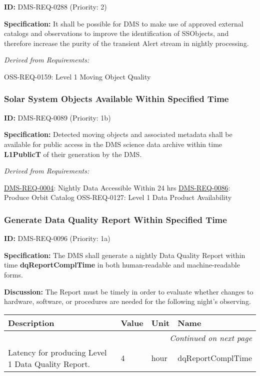 \documentclass[SE,toc,lsstdraft]{lsstdoc}
\makeatletter
\newcommand{\paramname}[1]{\hspace{0pt}#1}
\newcommand{\unitname}[1]{\hspace{0pt}#1}
\newenvironment{parameters}[0]{%
\setlength\LTleft{0pt}
\setlength\LTright{\fill}
\begin{small}
\begin{longtable}[]{|p{0.49\textwidth}|l|p{0.6in}|p{1.70in}@{}|}

\hline \textbf{Description} & \textbf{Value} & \textbf{Unit} & \textbf{Name} \\ \hline
\endhead

\hline \multicolumn{4}{r}{\emph{Continued on next page}} \\
\endfoot

\hline\hline
\endlastfoot
}{%
\hline
\end{longtable}
\end{small}
}
\makeatother
\begin{document}
\label{DMS-REQ-0288}
\textbf{ID:} DMS-REQ-0288 (Priority: 2)

\textbf{Specification:} It shall be possible for DMS to make use of approved external catalogs and observations to improve the identification of SSObjects, and therefore increase the purity of the transient Alert stream in nightly processing.

\emph{Derived from Requirements:}

OSS-REQ-0159:
Level 1 Moving Object Quality \newline

\subsubsection{Solar System Objects Available Within Specified Time}

\label{DMS-REQ-0089}
\textbf{ID:} DMS-REQ-0089 (Priority: 1b)

\textbf{Specification:} Detected moving objects and associated metadata shall be available for public access in the DMS science data archive within time \textbf{L1PublicT }of their generation by the DMS.

\emph{Derived from Requirements:}

\hyperref[DMS-REQ-0004]{DMS-REQ-0004}:
Nightly Data Accessible Within 24 hrs \newline
\hyperref[DMS-REQ-0086]{DMS-REQ-0086}:
Produce Orbit Catalog \newline
OSS-REQ-0127:
Level 1 Data Product Availability \newline

\subsubsection{Generate Data Quality Report Within Specified Time}

\label{DMS-REQ-0096}
\textbf{ID:} DMS-REQ-0096 (Priority: 1a)

\textbf{Specification:} The DMS shall generate a nightly Data Quality Report within time \textbf{dqReportComplTime }in both human-readable and machine-readable forms.

\textbf{Discussion:} The Report must be timely in order to evaluate whether changes to hardware, software, or procedures are needed for the following night's observing.

\begin{parameters}
Latency for producing Level 1 Data Quality Report.
&
4
&
\unitname{%
hour
}
&
\paramname{%
dqReportComplTime
} \\\hline
\end{parameters}
\end{document}
